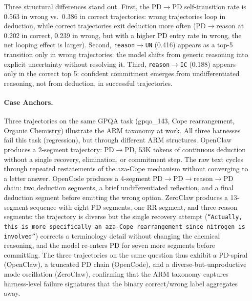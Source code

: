 Three structural differences stand out. First, the PD$\to$PD self-transition rate is 0.563 in wrong vs.\ 0.386 in correct trajectories: wrong trajectories loop in deduction, while correct trajectories exit deduction more often (PD$\to$reason at 0.202 in correct, 0.239 in wrong, but with a higher PD entry rate in wrong, the net looping effect is larger). Second, \texttt{reason}$\to$\texttt{UN} (0.416) appears as a top-5 transition only in wrong trajectories: the model shifts from generic reasoning into explicit uncertainty without resolving it. Third, \texttt{reason}$\to$\texttt{IC} (0.188) appears only in the correct top 5: confident commitment emerges from undifferentiated reasoning, not from deduction, in successful trajectories.

\paragraph{Case Anchors.}
Three trajectories on the same GPQA task (gpqa\_143, Cope rearrangement, Organic Chemistry) illustrate the ARM taxonomy at work. All three harnesses fail this task (regression), but through different ARM structures. OpenClaw produces a 2-segment trajectory: PD$\to$PD, 53K tokens of continuous deduction without a single recovery, elimination, or commitment step. The raw text cycles through repeated restatements of the aza-Cope mechanism without converging to a letter answer. OpenCode produces a 4-segment PD$\to$PD$\to$reason$\to$PD chain: two deduction segments, a brief undifferentiated reflection, and a final deduction segment before emitting the wrong option. ZeroClaw produces a 13-segment sequence with eight PD segments, one RR segment, and three reason segments: the trajectory is diverse but the single recovery attempt (\texttt{``Actually, this is more specifically an aza-Cope rearrangement since nitrogen is involved''}) corrects a terminology detail without changing the chemical reasoning, and the model re-enters PD for seven more segments before committing. The three trajectories on the same question thus exhibit a PD-spiral (OpenClaw), a truncated PD chain (OpenCode), and a diverse-but-unproductive mode oscillation (ZeroClaw), confirming that the ARM taxonomy captures harness-level failure signatures that the binary correct/wrong label aggregates away.
